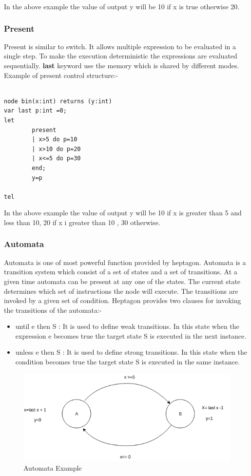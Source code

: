 \documentclass[16pt]{report}
\begin{document}
In the above example the value of output y will be 10 if x is true otherwise 20.

\subsubsection{Present}
Present is similar to switch. It allows multiple expression to be evaluated in a single step. To make the execution deterministic the expressions are evaluated sequentially. \textbf{last} keyword use the memory which is shared by different modes.\\
Example of present control structure:-

\newpage

\begin{verbatim}

node bin(x:int) returns (y:int)
var last p:int =0;
let 
    	present
    	| x>5 do p=10 
    	| x>10 do p=20
    	| x<=5 do p=30 
    	end;
    	y=p

tel
\end{verbatim}
In the above example the value of output y will be 10 if x is greater than 5 and less than 10, 20 if x i greater than 10 , 30 otherwise.

\subsubsection{Automata}
Automata is one of most powerful function provided by heptagon. Automata is a transition system which consist of a set of states and a set of transitions. At a given time automata can be present at any one of the states. The current state determines which set of instructions the node will execute. The transitions are invoked by a given set of condition. Heptagon provides two clauses for invoking the transitions of the automata:-
\begin{itemize}
    \item until e then S : It is used to define weak transitions. In this state when the expression e becomes true the target state S is executed in the next instance.
    \item unless e then S : It is used to define strong transitions. In this state when the condition becomes true the target state S is executed in the same instance.
\end{itemize}{}

\begin{figure}[H]
\centering
\includegraphics[width=\linewidth]{fig6.png}
\caption{Automata Example}
\end{figure}
\end{document}
